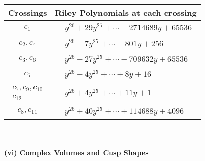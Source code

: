 \documentclass[1p]{elsarticle_modified}
\theoremstyle{definition}
\begin{document}
\begin{tabular}{m{50pt}|m{274pt}}
Crossings & \hspace{64pt}Riley Polynomials at each crossing \\
\hline $$\begin{aligned}c_{1}\end{aligned}$$&$\begin{aligned}
&y^{26}+29 y^{25}+\cdots-2714689 y+65536
\end{aligned}$\\
\hline $$\begin{aligned}c_{2},c_{4}\end{aligned}$$&$\begin{aligned}
&y^{26}-7 y^{25}+\cdots-801 y+256
\end{aligned}$\\
\hline $$\begin{aligned}c_{3},c_{6}\end{aligned}$$&$\begin{aligned}
&y^{26}-27 y^{25}+\cdots-709632 y+65536
\end{aligned}$\\
\hline $$\begin{aligned}c_{5}\end{aligned}$$&$\begin{aligned}
&y^{26}-4 y^{25}+\cdots+8 y+16
\end{aligned}$\\
\hline $$\begin{aligned}c_{7},c_{9},c_{10}\\c_{12}\end{aligned}$$&$\begin{aligned}
&y^{26}+4 y^{25}+\cdots+11 y+1
\end{aligned}$\\
\hline $$\begin{aligned}c_{8},c_{11}\end{aligned}$$&$\begin{aligned}
&y^{26}+40 y^{25}+\cdots+114688 y+4096
\end{aligned}$\\
\hline
\end{tabular}\\~\\
\newpage\flushleft \textbf{(vi) Complex Volumes and Cusp Shapes}
\end{document}

